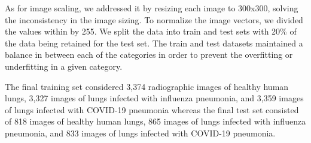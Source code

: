 \documentclass[12pt, twocolumn]{CUP-JNL-PPS}
\begin{document}
\vspace{-2\baselineskip}
\begin{figure}[hbp]
\centering
\begin{subfigure}
\centering
\scriptsize
{}
\end{subfigure}
\begin{subfigure}
\centering
\scriptsize
{}
\end{subfigure}
\begin{subfigure}
\centering
\scriptsize
{}
\end{subfigure}
\end{figure}
\vspace{-1\baselineskip}
As for image scaling, we addressed it by resizing each image to
300x300, solving the inconsistency in the image sizing. To normalize the image vectors, we divided the values within by 255. We split the data into train and test sets with 20\% of the data being
retained for the test set. The train and test datasets maintained a balance in between
each of the categories in order to prevent the overfitting or underfitting in a given
category.

The final training set considered 3,374 radiographic images of healthy
human lungs, 3,327 images of lungs infected with influenza pneumonia, and
3,359 images of lungs infected with COVID-19 pneumonia whereas the final test
set consisted of 818 images of healthy human lungs, 865 images of lungs infected
with influenza pneumonia, and 833 images of lungs infected with COVID-19
pneumonia.
\end{document}
